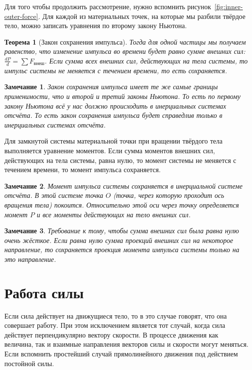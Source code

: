 \documentclass[10pt]{scrbook}
\newtheorem{theorem}{Теорема}[section]
\newtheorem{corollary}{Замечание}[theorem]
\begin{document}
Для того чтобы продолжить рассмотрение, нужно вспомнить
рисунок~\ref{fig:inner-outer-force}. Для каждой из материальных точек, на
которые мы разбили твёрдое тело, можно записать уравнения по второму закону
Ньютона.

\begin{theorem}[Закон сохранения импульса]\label{thrm:keep-moment-impuls}
	Тогда для одной частицы мы получаем равенство, что изменение импульса во времени
	будет равно сумме внешних сил: \( \frac{d P}{d} = \sum F_\text{внеш} \). Если
	сумма всех внешних сил, действующих на тела системы, то импульс системы не
	меняется с течением времени, то есть сохраняется.
\end{theorem}

\begin{corollary}
	Закон сохранения импульса имеет те же самые границы применимости, что и второй
	и третий законы Ньютона. То есть по первому закону Ньютона всё у нас должно
	происходить в инерциальных системах отсчёта. То есть закон сохранения импульса
	будет справедлив только в инерциальных системах отсчёта.
\end{corollary}

Для замкнутой системы материальной точки при вращении твёрдого тела выполняется
уравнение моментов. Если сумма моментов внешних сил, действующих на тела системы,
равна нулю, то момент системы не меняется с течением времени, то момент
импульса сохраняется.

\begin{corollary}
	Момент импульса системы сохраняется в инерциальной системе отсчёта. В этой
	системе точка $O$ (точка, через которую проходит ось вращения тела) покоится.
	Относительно этой оси через точку определяется момент $P$ и все моменты
	действующих на тело внешних сил.
\end{corollary}

\begin{corollary}
	Требование к тому, чтобы сумма внешних сил была равна нулю очень жёсткое.
	Если равна нулю сумма проекций внешних сил на некоторое направление, то
	сохраняется проекция момента импульса системы только на это направление.
\end{corollary}

\section{Работа силы}%

Если сила действует на движущиеся тело, то в это случае говорят, что она
совершает работу. При этом исключением является тот случай, когда сила
действует перпендикулярно вектору скорости. В процессе движения как величина,
так и взаимные направления векторов силы и скорости могут меняться. Если
вспомнить простейший случай прямолинейного движения под действием постойной
силы.
\end{document}
